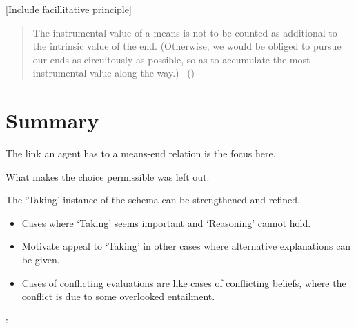 \documentclass[10pt]{article}
\newcommand{\hand}{\ding{43}}
\newcommand{\hozlinedash}[0]{%
  \noindent\hdashrule[0.5ex][c]{\textwidth}{.1pt}{2.5pt}
}
\begin{document}
\begin{center}
  [Include facillitative principle]
\end{center}

\hozlinedash

\begin{quote}
  The instrumental value of a means is not to be counted as additional to the intrinsic value of the end.
  (Otherwise, we would be obliged to pursue our ends as circuitously as possible, so as to accumulate the most instrumental value along the way.)\nolinebreak
  \mbox{ }\hfill(\cite[65]{Velleman:2000ab})
\end{quote}

\hozlinedash

\newpage

\section{Summary}
\label{sec:summary}


The link an agent has to a means-end relation is the focus here.

What makes the choice permissible was left out.

The `Taking' instance of the schema can be strengthened and refined.




\begin{itemize}
\item[\hand] Cases where `Taking' seems important and `Reasoning' cannot hold.
\item Motivate appeal to `Taking' in other cases where alternative explanations can be given.
\end{itemize}






\begin{itemize}
\item Cases of conflicting evaluations are like cases of conflicting beliefs, where the conflict is due to some overlooked entailment.
\end{itemize}

\citeauthor{Broome:2002aa}:
\end{document}
